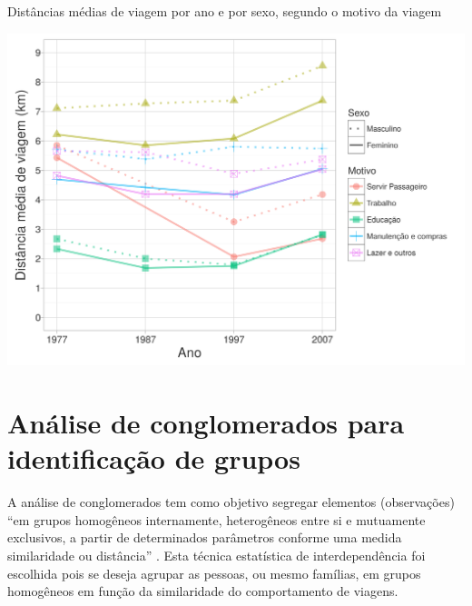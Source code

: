 \begin{grafico}[htb]%
    \caption{\label{graf:distancia-motivo}Distâncias médias de viagem por ano e por sexo, segundo o motivo da viagem}%
    \begin{center}%
        \includegraphics[width=1\textwidth]{./imagens/distancia-motivo.png}%
    \end{center}%
\end{grafico}%











\clearpage
\section{Análise de conglomerados para identificação de grupos}\label{sec:analises-clusters}

A análise de conglomerados tem como objetivo segregar elementos (observações) “em grupos homogêneos internamente, heterogêneos entre si e mutuamente exclusivos, a partir de determinados parâmetros conforme uma medida similaridade ou distância” \cite[p.196]{FAVERO2009}.  Esta técnica estatística de interdependência foi escolhida pois se deseja agrupar as pessoas, ou mesmo famílias, em grupos homogêneos em função da similaridade do comportamento de viagens.

